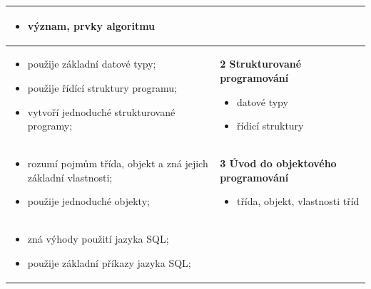 \documentclass[FP,DP]{tulthesis}
\begin{document}
{{\begin{table}[ht]
\begin{tabular}{|l|l|}
\begin{minipage}[t]{0.45\textwidth}
\begin{itemize}[leftmargin=*,nosep]
  \item význam, prvky algoritmu  
\end{itemize}
  \end{minipage}\\\hline
  \begin{minipage}[t]{0.45\textwidth}
\begin{itemize}[leftmargin=*,nosep]
  	\item použije základní datové typy; 
	\item použije řídící struktury programu; 
	\item vytvoří jednoduché strukturované programy;    
\end{itemize}
  \end{minipage} &
  \begin{minipage}[t]{0.45\textwidth}
\textbf{2 Strukturované programování }
    \begin{itemize}[leftmargin=*,nosep]
  \item datové typy
\item řídicí struktury  
\end{itemize}
  \end{minipage}\\\hline
  \begin{minipage}[t]{0.45\textwidth}
\begin{itemize}[leftmargin=*,nosep]
  	\item rozumí pojmům třída, objekt a zná jejich základní vlastnosti; 
	\item použije jednoduché objekty; 
\end{itemize}
  \end{minipage} &
  \begin{minipage}[t]{0.45\textwidth}
\textbf{3 Úvod do objektového programování }
    \begin{itemize}[leftmargin=*,nosep]
  \item třída, objekt, vlastnosti tříd
\end{itemize}
  \end{minipage}\\\hline
  \begin{minipage}[t]{0.45\textwidth}
\begin{itemize}[leftmargin=*,nosep]
  	\item zná výhody použití jazyka SQL; 
	\item použije základní příkazy jazyka SQL; 
\end{itemize}
  \end{minipage} &
  \begin{minipage}[t]{0.45\textwidth}

\end{minipage}
\end{tabular}
\end{table}}}
\end{document}
